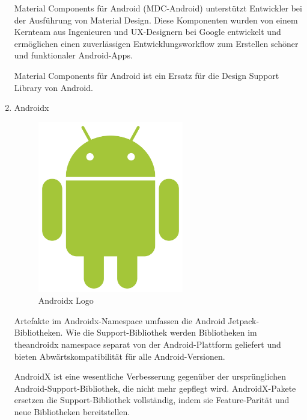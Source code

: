 \documentclass[10pt]{scrartcl}
\begin{document}
\begin{enumerate}

Material Components für Android (MDC-Android) unterstützt Entwickler bei der Ausführung von Material Design. Diese Komponenten wurden von einem Kernteam aus Ingenieuren und UX-Designern bei Google entwickelt und ermöglichen einen zuverlässigen Entwicklungsworkflow zum Erstellen schöner und funktionaler Android-Apps.

Material Components für Android ist ein Ersatz für die Design Support Library von Android.

	\item
	Androidx

\begin{figure}[H]
	\centering
	\includegraphics[width=0.6\textwidth]{Bilder/BibliothekenLogos/AndroidLogo.png}
	\caption{Androidx Logo}
\end{figure}
	

Artefakte im Androidx-Namespace umfassen die Android Jetpack-Bibliotheken. Wie die Support-Bibliothek werden Bibliotheken im theandroidx namespace separat von der Android-Plattform geliefert und bieten Abwärtskompatibilität für alle Android-Versionen.

AndroidX ist eine wesentliche Verbesserung gegenüber der ursprünglichen Android-Support-Bibliothek, die nicht mehr gepflegt wird. AndroidX-Pakete ersetzen die Support-Bibliothek vollständig, indem sie Feature-Parität und neue Bibliotheken bereitstellen.

\end{enumerate}
\end{document}
